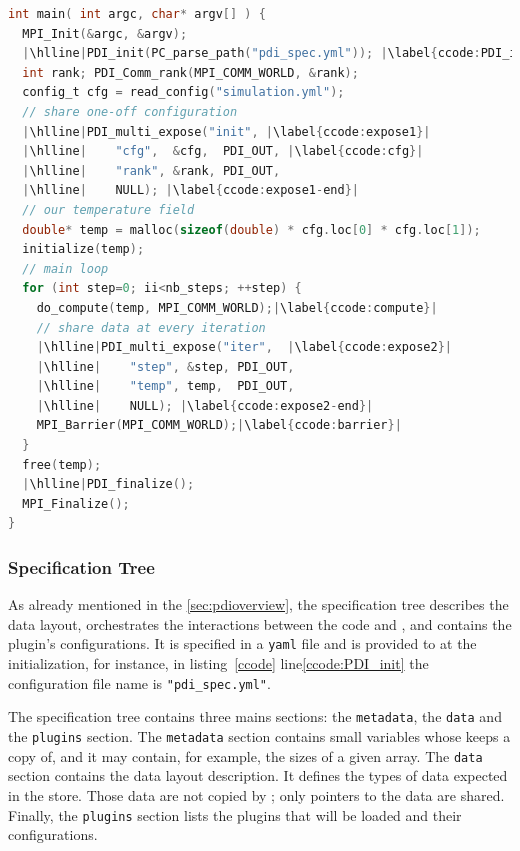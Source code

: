 \begin{lstlisting}[float, label=ccode, language=c, caption=\pdi instrumentation of the C simulation code]
int main( int argc, char* argv[] ) {
  MPI_Init(&argc, &argv);
  |\hlline|PDI_init(PC_parse_path("pdi_spec.yml")); |\label{ccode:PDI_init}|
  int rank; PDI_Comm_rank(MPI_COMM_WORLD, &rank);
  config_t cfg = read_config("simulation.yml");
  // share one-off configuration
  |\hlline|PDI_multi_expose("init", |\label{ccode:expose1}|
  |\hlline|    "cfg",  &cfg,  PDI_OUT, |\label{ccode:cfg}|
  |\hlline|    "rank", &rank, PDI_OUT,
  |\hlline|    NULL); |\label{ccode:expose1-end}|
  // our temperature field
  double* temp = malloc(sizeof(double) * cfg.loc[0] * cfg.loc[1]);
  initialize(temp);
  // main loop
  for (int step=0; ii<nb_steps; ++step) {
    do_compute(temp, MPI_COMM_WORLD);|\label{ccode:compute}|
    // share data at every iteration
    |\hlline|PDI_multi_expose("iter",  |\label{ccode:expose2}|
    |\hlline|    "step", &step, PDI_OUT,
    |\hlline|    "temp", temp,  PDI_OUT,
    |\hlline|    NULL); |\label{ccode:expose2-end}|
    MPI_Barrier(MPI_COMM_WORLD);|\label{ccode:barrier}|
  }
  free(temp);
  |\hlline|PDI_finalize();
  MPI_Finalize();
}
\end{lstlisting}

\subsubsection{\pdi Specification Tree}
As already mentioned in the \ref{sec:pdioverview}, the specification tree describes the data layout, orchestrates the interactions between the code and \pdi, and contains the plugin's configurations. It is specified in a \texttt{yaml} file and is provided to \pdi at the initialization, for instance, in listing~\ref{ccode} line\ref{ccode:PDI_init} the configuration file name is \texttt{"pdi\_spec.yml"}. 

The specification tree contains three mains sections: the \texttt{metadata}, the \texttt{data} and the \texttt{plugins} section. The \texttt{metadata} section contains small variables whose \pdi keeps a copy of, and it may contain, for example, the sizes of a given array. The \texttt{data} section contains the data layout description. It defines the types of data expected in the store. Those data are not copied by \pdi; only pointers to the data are shared. Finally, the \texttt{plugins} section lists the plugins that will be loaded and their configurations. 

